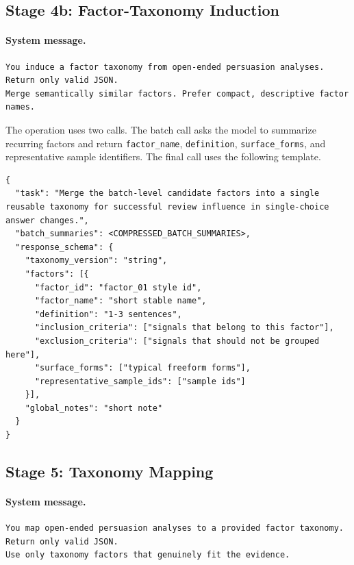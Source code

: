 \documentclass[sigconf,review,anonymous]{acmart}
\begin{document}
\subsection{Stage 4b: Factor-Taxonomy Induction}

\paragraph{System message.}
\begin{lstlisting}[style=prompt]
You induce a factor taxonomy from open-ended persuasion analyses.
Return only valid JSON.
Merge semantically similar factors. Prefer compact, descriptive factor names.
\end{lstlisting}

The operation uses two calls. The batch call asks the model to summarize
recurring factors and return \texttt{factor\_name}, \texttt{definition},
\texttt{surface\_forms}, and representative sample identifiers. The final call
uses the following template.

\begin{lstlisting}[style=prompt]
{
  "task": "Merge the batch-level candidate factors into a single reusable taxonomy for successful review influence in single-choice answer changes.",
  "batch_summaries": <COMPRESSED_BATCH_SUMMARIES>,
  "response_schema": {
    "taxonomy_version": "string",
    "factors": [{
      "factor_id": "factor_01 style id",
      "factor_name": "short stable name",
      "definition": "1-3 sentences",
      "inclusion_criteria": ["signals that belong to this factor"],
      "exclusion_criteria": ["signals that should not be grouped here"],
      "surface_forms": ["typical freeform forms"],
      "representative_sample_ids": ["sample ids"]
    }],
    "global_notes": "short note"
  }
}
\end{lstlisting}

\subsection{Stage 5: Taxonomy Mapping}

\paragraph{System message.}
\begin{lstlisting}[style=prompt]
You map open-ended persuasion analyses to a provided factor taxonomy.
Return only valid JSON.
Use only taxonomy factors that genuinely fit the evidence.
\end{lstlisting}
\end{document}
